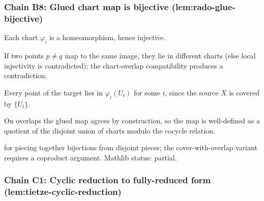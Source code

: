 \subsubsection*{Chain B8: Glued chart map is bijective (lem:rado-glue-bijective)}

\begin{lemma}
\label{lem:rgb-r1}
Each chart $\varphi_{i}$ is a homeomorphism, hence injective.
\leanok
\end{lemma}

\begin{lemma}
\label{lem:rgb-r2}
If two points $p \neq q$ map to the same image, they lie in different charts (else local injectivity is contradicted); the chart-overlap compatibility produces a contradiction.
\leanok
\end{lemma}

\begin{lemma}
\label{lem:rgb-r3}
Every point of the target lies in $\varphi_{i}(U_{i})$ for some $i$, since the source $X$ is covered by $\{U_{i}\}$.
\leanok
\end{lemma}

\begin{lemma}
\label{lem:rgb-r4}
On overlaps the glued map agrees by construction, so the map is well-defined as a quotient of the disjoint union of charts modulo the cocycle relation.
\leanok
\end{lemma}

\begin{lemma}
\label{lem:rgb-r5}
 for piecing together bijections from disjoint pieces; the cover-with-overlap variant requires a coproduct argument.  Mathlib status: partial.
\leanok
\end{lemma}

\subsubsection*{Chain C1: Cyclic reduction to fully-reduced form (lem:tietze-cyclic-reduction)}


